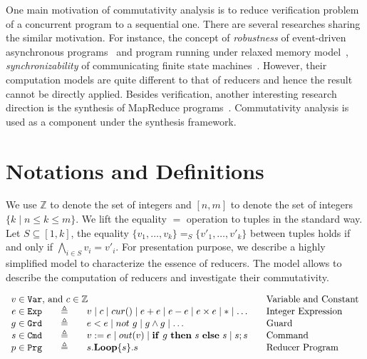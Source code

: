 \documentclass{llncs}
\newcommand{\Var}{\mathtt{Var}}
\newcommand{\Exp}{\mathtt{Exp}}
\newcommand{\Cmd}{\mathtt{Cmd}}
\newcommand{\Grd}{\mathtt{Grd}}
\newcommand{\Prg}{\mathtt{Prg}}
\newcommand{\cur}{cur()}
\newcommand{\ite}[3]{
	 \ifmmode 
	 \mathbf{if}\ #1 \ \mathbf{then}\ #2\  \mathbf{else}\ #3 
	 \else
	 \textbf{if}\ #1 \ \textbf{then}\ #2\  \textbf{else}\ #3
	 \fi}
\newcommand{\rloop}{
	\ifmmode 
	\mathbf{Loop}
	\else
	\textbf{Loop}
	\fi}
\newcommand{\Z}{\mathbb{Z}}
\begin{document}
One main motivation of commutativity analysis is to reduce verification problem of a concurrent program to a sequential one. There are several researches sharing the similar motivation. For instance, the concept of \emph{robustness} of event-driven asynchronous programs~\cite{ahmed2017:robustness}  and program running under relaxed memory model~\cite{ahmed2013:robustness,AbdullaACLR13,AbdullaACLR12}, \emph{synchronizability} of communicating finite state machines~\cite{FinkelL17,basu2012synchronizability,basu2011choreography}. However, their computation models are quite different to that of reducers and hence the result cannot be directly applied. Besides verification, another interesting research direction is the synthesis of MapReduce programs~\cite{SmithA16}. Commutativity analysis is used as a component under the synthesis framework.

\section{Notations and Definitions}
\label{section:integer-reducers}
We use $\Z$ to denote the set of integers and $[n,m]$ to denote the set of integers $\{k\mid n \leq k\leq m\}$. 
We lift the equality $=$ operation to tuples in the standard way.
Let $S\subseteq [1,k]$, the equality $\{v_1,\ldots,v_k\}=_{S} \{v'_1,\ldots,v'_k\}$ between tuples holds if and only if $\bigwedge_{i\in S} v_i=v'_i$.
For presentation purpose, we describe a highly simplified model to characterize the essence of reducers. The model allows to describe the computation of reducers and investigate their commutativity.

\begin{equation*}
\begin{array}{rclcl}
\multicolumn{3}{l}{v\in \Var\mbox{, and }c \in \Z}&&\textmd{Variable and Constant}\\
e \in \Exp    &\ \ \  {\triangleq}\ \ \   & v \mid c \mid \cur \mid e + e \mid e - e \mid e \times e \mid *\mid\ldots & &\textmd{Integer Expression}\\
g\in \Grd  & {\triangleq}  & e < e \mid not\ g \mid g \wedge g  \mid \ldots& & \textmd{Guard}\\
s\in \Cmd  & {\triangleq}  & v:= e \mid out(v) \mid \ite{g}{s}{s} \mid s;s && \textmd{Command}\\
p\in \Prg  & {\triangleq}  & s.\rloop\{s\}.s&& \textmd{Reducer Program}\\
\end{array}
\end{equation*}
\end{document}
